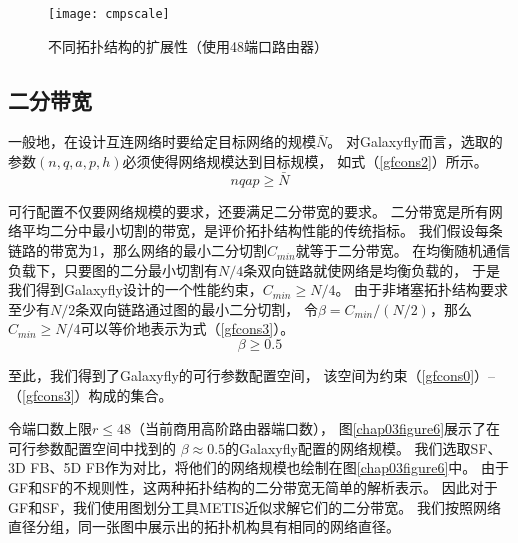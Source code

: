 \begin{figure}[t]
  \centering
  \texttt{[image: cmpscale]}\\
  \caption{不同拓扑结构的扩展性（使用48端口路由器）}
  \label{fig:Figure3}
\end{figure}


\subsection{二分带宽}
一般地，在设计互连网络时要给定目标网络的规模$\bar{N}$。
对Galaxyfly而言，选取的参数$(n,q,a,p,h)$必须使得网络规模达到目标规模，
如式（\ref{gfcons2}）所示。
\begin{equation}\label{gfcons2}
  nqap \ge \bar{N}
\end{equation}

可行配置不仅要网络规模的要求，还要满足二分带宽的要求。
二分带宽是所有网络平均二分中最小切割的带宽，是评价拓扑结构性能的传统指标。
我们假设每条链路的带宽为1，那么网络的最小二分切割$C_{min}$就等于二分带宽。
在均衡随机通信负载下，只要图的二分最小切割有$N/4$条双向链路就使网络是均衡负载的，
于是我们得到Galaxyfly设计的一个性能约束，$C_{min} \ge N/4$。
由于非堵塞拓扑结构要求至少有$N/2$条双向链路通过图的最小二分切割，
令$\beta=C_{min}/(N/2)$，那么$C_{min} \ge N/4$可以等价地表示为式（\ref{gfcons3}）。
\begin{equation}\label{gfcons3}
  \beta \ge 0.5
\end{equation}

至此，我们得到了Galaxyfly的可行参数配置空间，
该空间为约束（\ref{gfcons0}）--（\ref{gfcons3}）构成的集合。

令端口数上限$r \le 48$（当前商用高阶路由器端口数），
图\ref{chap03figure6}展示了在可行参数配置空间中找到的
$\beta \approx 0.5$的Galaxyfly配置的网络规模。
我们选取SF、3D FB、5D FB作为对比，将他们的网络规模也绘制在图\ref{chap03figure6}中。
由于GF和SF的不规则性，这两种拓扑结构的二分带宽无简单的解析表示。
因此对于GF和SF，我们使用图划分工具METIS近似求解它们的二分带宽。
我们按照网络直径分组，同一张图中展示出的拓扑机构具有相同的网络直径。

